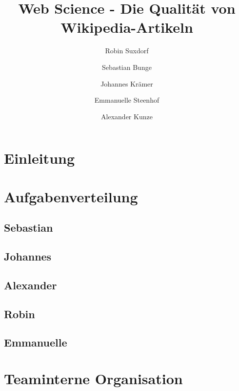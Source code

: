 \documentclass[researchlab,palatino]{AIGpaper}
\author{Robin Suxdorf \and Sebastian Bunge \and Johannes Krämer \and Emmanuelle Steenhof \and Alexander Kunze}
\title{Web Science - Die Qualität von Wikipedia-Artikeln}
\begin{document}
\maketitle %



\section{Einleitung}





\section{Aufgabenverteilung}
\label{Aufgabenverteilung}


\subsection{Sebastian}


\subsection{Johannes}


\subsection{Alexander}


\subsection{Robin}


\subsection{Emmanuelle}


\section{Teaminterne Organisation}
\label{Organisation}

\end{document}
